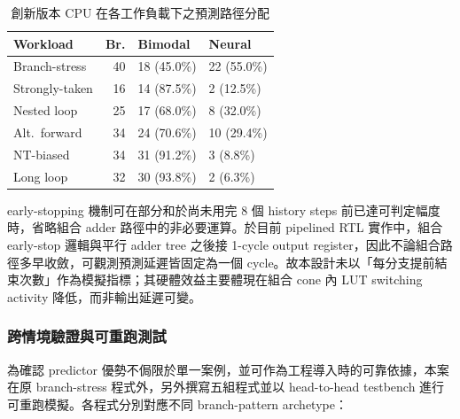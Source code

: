 \documentclass[12pt,a4paper]{article}
\begin{document}
	\begin{table}[htbp]
		\centering
		\caption{創新版本 CPU 在各工作負載下之預測路徑分配}
		\label{tab:internal}
		\begin{tabularx}{\linewidth}{p{2.2cm}rYY}
			\toprule
			\textbf{Workload} & \textbf{Br.}
			                  & \textbf{Bimodal}
			                  & \textbf{Neural}                              \\
			\midrule
			Branch-stress     & 40               & 18 (45.0\%) & 22 (55.0\%) \\
			Strongly-taken    & 16               & 14 (87.5\%) & 2 (12.5\%)  \\
			Nested loop       & 25               & 17 (68.0\%) & 8 (32.0\%)  \\
			Alt.\ forward     & 34               & 24 (70.6\%) & 10 (29.4\%) \\
			NT-biased         & 34               & 31 (91.2\%) & 3 (8.8\%)   \\
			Long loop         & 32               & 30 (93.8\%) & 2 (6.3\%)   \\
			\bottomrule
		\end{tabularx}
	\end{table}

	early-stopping 機制可在部分和於尚未用完 8 個 history steps 前已達可判定幅度時，省略組合 adder 路徑中的非必要運算。於目前 pipelined RTL 實作中，組合 early-stop 邏輯與平行 adder tree 之後接 1-cycle output register，因此不論組合路徑多早收斂，可觀測預測延遲皆固定為一個 cycle。故本設計未以「每分支提前結束次數」作為模擬指標；其硬體效益主要體現在組合 cone 內 LUT switching activity 降低，而非輸出延遲可變。

	\subsubsection{跨情境驗證與可重跑測試}
	\label{sec:multiworkload}

	為確認 predictor 優勢不侷限於單一案例，並可作為工程導入時的可靠依據，本案在原 branch-stress 程式外，另外撰寫五組程式並以 head-to-head testbench 進行可重跑模擬。各程式分別對應不同 branch-pattern archetype：
\end{document}
